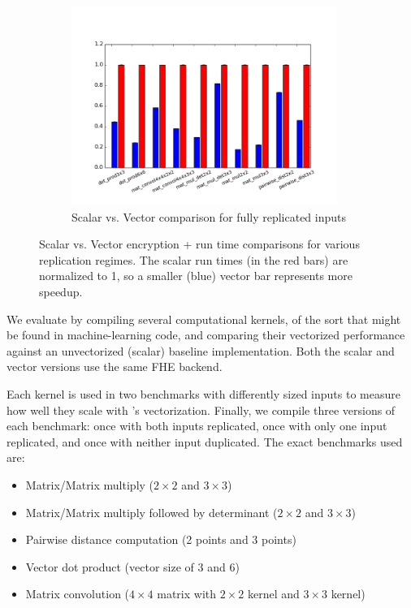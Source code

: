 \begin{figure}
\begin{subfigure}{0.3\textwidth}
    \end{subfigure}
    \begin{subfigure}{0.3\textwidth}
        \includegraphics[width=0.95\textwidth]{figures/newAspectRatioGraphs/DataReplicatedENC+RUN.png}
        \caption{Scalar vs. Vector comparison for fully replicated inputs}\label{fig:ml-kernels-repl}
    \end{subfigure}
    \caption{Scalar vs. Vector encryption + run time comparisons for various replication regimes. The scalar run times (in the red bars) are normalized to 1, so a smaller (blue) vector bar represents more speedup.}\label{fig:ml-kernels}
\end{figure}

We evaluate \system by compiling several computational kernels, of the sort that might be found in machine-learning code, and comparing their vectorized performance against an unvectorized (scalar) baseline implementation. Both the scalar and vector versions use the same FHE backend.

Each kernel is used in two benchmarks with differently sized inputs to measure how well they scale with \system's vectorization.
Finally, we compile three versions of each benchmark: once with both inputs replicated, once with only one input replicated, and once with neither input duplicated. 
The exact benchmarks used are:
\begin{itemize}
    \item Matrix/Matrix multiply ($2 \times 2$ and $3 \times 3$)
    \item Matrix/Matrix multiply followed by determinant ($2 \times 2$ and $3 \times 3$)
    \item Pairwise distance computation (2 points and 3 points)
    \item Vector dot product (vector size of 3 and 6)
    \item Matrix convolution ($4 \times 4$ matrix with $2 \times 2$ kernel and $3 \times 3$ kernel)
\end{itemize}

